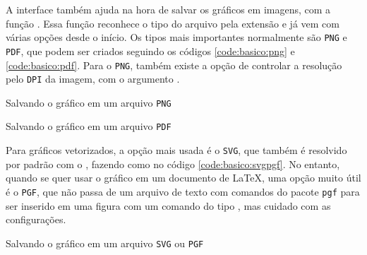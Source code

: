 A interface \pyplot também ajuda na hora de salvar os gráficos em imagens, com a função \href{https://matplotlib.org/3.1.0/api/_as_gen/matplotlib.pyplot.savefig.html}{}. Essa função reconhece o tipo do arquivo pela extensão e já vem com várias opções desde o início. Os tipos mais importantes normalmente são \texttt{PNG} e \texttt{PDF}, que podem ser criados seguindo os códigos \ref{code:basico:png} e  \ref{code:basico:pdf}. Para o \texttt{PNG}, também existe a opção de controlar a resolução pelo \texttt{DPI} da imagem, com o argumento .

\begin{listing}[H]
    \caption{Salvando o gráfico em um arquivo \texttt{PNG}}
    \label{code:basico:png}

\end{listing}

\begin{listing}[H]
    \caption{Salvando o gráfico em um arquivo \texttt{PDF}}
    \label{code:basico:pdf}

\end{listing}

Para gráficos vetorizados, a opção mais usada é o \texttt{SVG}, que também é resolvido por padrão com o \matplotlib, fazendo como no código \ref{code:basico:svgpgf}. No entanto, quando se quer usar o gráfico em um documento de \LaTeX, uma opção muito útil é o \texttt{PGF}, que não passa de um arquivo de texto com comandos do pacote \texttt{pgf} para ser inserido em uma figura com um comando do tipo \texttt{}, mas cuidado com as configurações.

\begin{listing}[H]
    \caption{Salvando o gráfico em um arquivo \texttt{SVG} ou \texttt{PGF}}
    \label{code:basico:svgpgf}

\end{listing}
